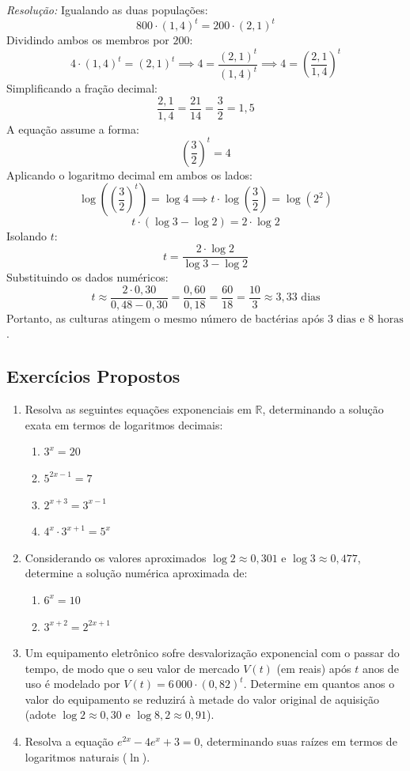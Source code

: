 \documentclass[12pt,a4paper]{report}
\begin{document}
	\textit{Resolução:}  
	Igualando as duas populações:
	$$800 \cdot (1{,}4)^t = 200 \cdot (2{,}1)^t$$
	Dividindo ambos os membros por $200$:
	$$4 \cdot (1{,}4)^t = (2{,}1)^t \implies 4 = \frac{(2{,}1)^t}{(1{,}4)^t} \implies 4 = \left(\frac{2{,}1}{1{,}4}\right)^t$$
	Simplificando a fração decimal:
	$$\frac{2{,}1}{1{,}4} = \frac{21}{14} = \frac{3}{2} = 1{,}5$$
	A equação assume a forma:
	$$\left(\frac{3}{2}\right)^t = 4$$
	Aplicando o logaritmo decimal em ambos os lados:
	$$\log\left(\left(\frac{3}{2}\right)^t\right) = \log 4 \implies t \cdot \log\left(\frac{3}{2}\right) = \log(2^2)$$
	$$t \cdot (\log 3 - \log 2) = 2 \cdot \log 2$$
	Isolando $t$:
	$$t = \frac{2 \cdot \log 2}{\log 3 - \log 2}$$
	Substituindo os dados numéricos:
	$$t \approx \frac{2 \cdot 0{,}30}{0{,}48 - 0{,}30} = \frac{0{,}60}{0{,}18} = \frac{60}{18} = \frac{10}{3} \approx 3{,}33\text{ dias}$$
	Portanto, as culturas atingem o mesmo número de bactérias após $3\text{ dias e } 8\text{ horas}$.
	
	\subsection*{Exercícios Propostos}
	
	\begin{enumerate}
		\item Resolva as seguintes equações exponenciais em $\mathbb{R}$, determinando a solução exata em termos de logaritmos decimais:
		\begin{enumerate}[label=\textbf{\alph*)}]
			\item $3^x = 20$
			\item $5^{2x - 1} = 7$
			\item $2^{x + 3} = 3^{x - 1}$
			\item $4^x \cdot 3^{x + 1} = 5^x$
		\end{enumerate}
		
		\item Considerando os valores aproximados $\log 2 \approx 0{,}301$ e $\log 3 \approx 0{,}477$, determine a solução numérica aproximada de:
		\begin{enumerate}[label=\textbf{\alph*)}]
			\item $6^x = 10$
			\item $3^{x + 2} = 2^{2x + 1}$
		\end{enumerate}
		
		\item Um equipamento eletrônico sofre desvalorização exponencial com o passar do tempo, de modo que o seu valor de mercado $V(t)$ (em reais) após $t$ anos de uso é modelado por $V(t) = 6\,000 \cdot (0{,}82)^t$. Determine em quantos anos o valor do equipamento se reduzirá à metade do valor original de aquisição (adote $\log 2 \approx 0{,}30$ e $\log 8{,}2 \approx 0{,}91$).
		
		\item Resolva a equação $e^{2x} - 4e^x + 3 = 0$, determinando suas raízes em termos de logaritmos naturais ($\ln$).
	\end{enumerate}
	
\end{document}
